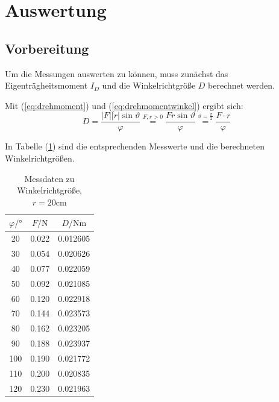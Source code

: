 \section{Auswertung}
\label{sec:Auswertung}

\subsection{Vorbereitung}\label{subsec:Vorbereitung}
Um die Messungen auswerten zu können, muss zunächst das Eigenträgheitsmoment $I_{D}$ und die Winkelrichtgröße $D$ berechnet werden.

Mit (\ref{eq:drehmoment}) und (\ref{eq:drehmomentwinkel}) ergibt sich:
\begin{equation}
D = \frac{\lvert F \rvert \lvert r \rvert \sin{\vartheta}}{\varphi} \stackrel{F,r > 0}{=} \frac{F r \sin{\vartheta}}{\varphi} 
\stackrel{\vartheta = \frac{\pi}{2}}{=} \frac{F \cdot r}{\varphi}
\end{equation}

In Tabelle (\ref{tab:Winkelrichtgröße}) sind die entsprechenden Messwerte und die berechneten Winkelrichtgrößen.

\begin{table}
\centering
\caption{Messdaten zu Winkelrichtgröße, $r = 20 \unit{\centi\meter}$}
\label{tab:Winkelrichtgröße}
\begin{tabular}{c c c}
  \toprule
  $\varphi / °$  &  $F / \unit\newton$ & $D / \unit{\newton\meter}$ \\
  \midrule
              20 &        0.022 &     0.012605 \\
              30 &        0.054 &     0.020626 \\
              40 &        0.077 &     0.022059 \\
              50 &        0.092 &     0.021085 \\
              60 &        0.120 &     0.022918 \\
              70 &        0.144 &     0.023573 \\
              80 &        0.162 &     0.023205 \\
              90 &        0.188 &     0.023937 \\
             100 &        0.190 &     0.021772 \\
             110 &        0.200 &     0.020835 \\
             120 &        0.230 &     0.021963 \\
  \bottomrule
\end{tabular}
\end{table}

